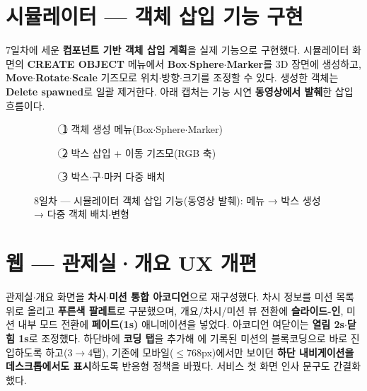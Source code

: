 \section{시뮬레이터 — 객체 삽입 기능 구현}
7일차에 세운 \textbf{컴포넌트 기반 객체 삽입 계획}을 실제 기능으로 구현했다. 시뮬레이터 화면의
\textbf{CREATE OBJECT} 메뉴에서 \textbf{Box$\cdot$Sphere$\cdot$Marker}를 3D 장면에 생성하고,
\textbf{Move$\cdot$Rotate$\cdot$Scale} 기즈모로 위치$\cdot$방향$\cdot$크기를 조정할 수 있다. 생성한
객체는 \textbf{Delete spawned}로 일괄 제거한다. 아래 캡처는 기능 시연 \textbf{동영상에서 발췌}한
삽입 흐름이다.

\smallskip
\noindent{}  %
 

\begin{figure}[htbp]\centering
  \begin{subfigure}{0.32\linewidth}\centering
    \caption{\textcircled{1} 객체 생성 메뉴(Box$\cdot$Sphere$\cdot$Marker)}
  \end{subfigure}\hfill
  \begin{subfigure}{0.32\linewidth}\centering
    \caption{\textcircled{2} 박스 삽입 + 이동 기즈모(RGB 축)}
  \end{subfigure}\hfill
  \begin{subfigure}{0.32\linewidth}\centering
    \caption{\textcircled{3} 박스$\cdot$구$\cdot$마커 다중 배치}
  \end{subfigure}
  \caption{8일차 — 시뮬레이터 객체 삽입 기능(동영상 발췌): 메뉴 → 박스 생성 → 다중 객체 배치$\cdot$변형}
\end{figure}

\section{웹 — 관제실·개요 UX 개편}
관제실$\cdot$개요 화면을 \textbf{차시$\cdot$미션 통합 아코디언}으로 재구성했다. 차시 정보를 미션 목록
위로 올리고 \textbf{푸른색 팔레트}로 구분했으며, 개요/차시/미션 뷰 전환에 \textbf{슬라이드-인},
미션 내부 모드 전환에 \textbf{페이드(1s)} 애니메이션을 넣었다. 아코디언 여닫이는
\textbf{열림 2s$\cdot$닫힘 1s}로 조정했다. 하단바에 \textbf{코딩 탭}을 추가해 에
기록된 미션의 블록코딩으로 바로 진입하도록 하고(3$\to$4탭), 기존에 모바일($\leq$768px)에서만
보이던 \textbf{하단 내비게이션을 데스크톱에서도 표시}하도록 반응형 정책을 바꿨다. 서비스 첫 화면
인사 문구도 간결화했다.

